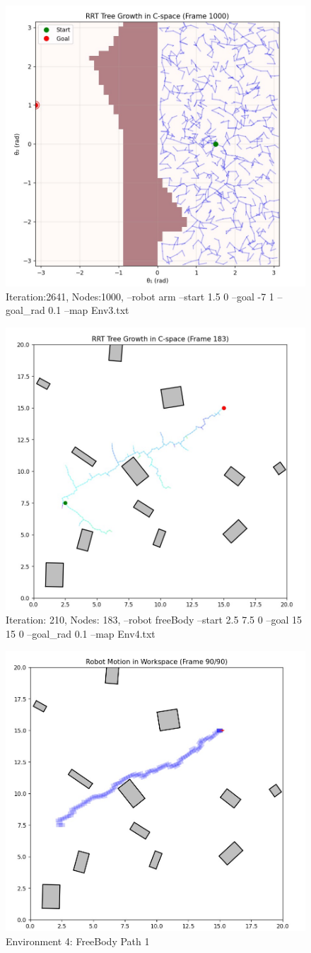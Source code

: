 \documentclass{article}
\begin{document}
\begin{figure} [H]
    \centering
    \includegraphics[width=0.5\linewidth]{latex_media/Env3TreeGrowthA2.jpg}
    \caption{Iteration:2641, Nodes:1000, --robot arm --start 1.5 0 --goal -7 1 --goal\_rad 0.1 --map Env3.txt }
\end{figure}

\begin{figure} [H]
    \centering
    \includegraphics[width=0.5\linewidth]{latex_media/Env4TreeGrowthFB1.jpg}
    \caption{Iteration: 210, Nodes: 183, --robot freeBody --start 2.5 7.5  0 --goal 15 15 0 --goal\_rad 0.1 --map Env4.txt}
\end{figure}

\begin{figure} [H]
    \centering
    \includegraphics[width=0.5\linewidth]{latex_media/Env4RobotPathFB1.jpg}
    \caption{Environment 4: FreeBody Path 1}
\end{figure}
\end{document}
